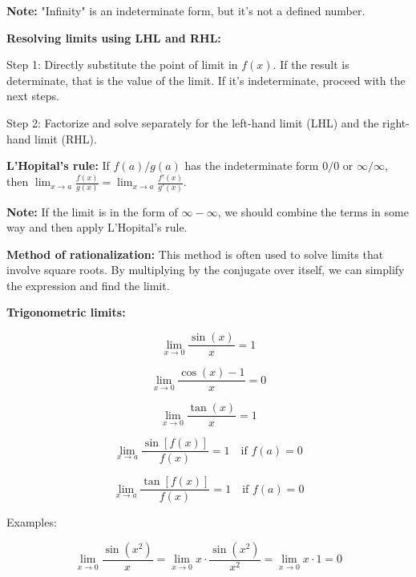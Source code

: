 \documentclass{article}
\begin{document}
\textbf{Note:} "Infinity" is an indeterminate form, but it's not a defined number.

\textbf{Resolving limits using LHL and RHL:}

Step 1: Directly substitute the point of limit in $f(x)$. If the result is determinate, that is the value of the limit. If it's indeterminate, proceed with the next steps.

Step 2: Factorize and solve separately for the left-hand limit (LHL) and the right-hand limit (RHL).

\textbf{L'Hopital's rule:} If $f(a)/g(a)$ has the indeterminate form $0/0$ or $\infty/\infty$, then $\lim_{x \to a} \frac{f(x)}{g(x)} = \lim_{x \to a} \frac{f'(x)}{g'(x)}$.

\textbf{Note:} If the limit is in the form of $\infty - \infty$, we should combine the terms in some way and then apply L'Hopital's rule.

\textbf{Method of rationalization:} This method is often used to solve limits that involve square roots. By multiplying by the conjugate over itself, we can simplify the expression and find the limit.

\textbf{Trigonometric limits:}

\begin{equation}
\lim_{x \to 0} \frac{\sin(x)}{x} = 1
\end{equation}

\begin{equation}
\lim_{x \to 0} \frac{\cos(x) - 1}{x} = 0
\end{equation}

\begin{equation}
\lim_{x \to 0} \frac{\tan(x)}{x} = 1
\end{equation}

\begin{equation}
\lim_{x \to a} \frac{\sin[f(x)]}{f(x)} = 1 \quad \text{if } f(a) = 0
\end{equation}

\begin{equation}
\lim_{x \to a} \frac{\tan[f(x)]}{f(x)} = 1 \quad \text{if } f(a) = 0
\end{equation}

Examples:

\begin{equation}
\lim_{x \to 0} \frac{\sin(x^2)}{x} = \lim_{x \to 0} x \cdot \frac{\sin(x^2)}{x^2} = \lim_{x \to 0} x \cdot 1 = 0
\end{equation}
\end{document}
